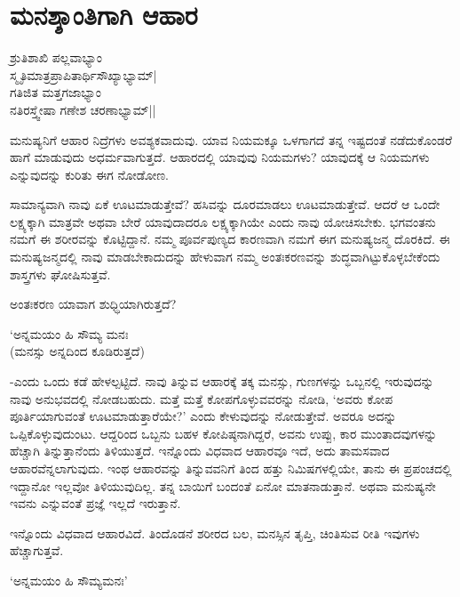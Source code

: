 \chapter{ಮನಶ್ಶಾಂತಿಗಾಗಿ ಆಹಾರ}

\begin{shloka}
ಶ್ರುತಿಶಾಖಿ ಪಲ್ಲವಾಭ್ಯಾಂ\\
ಸ್ಮೃತಿಮಾತ್ರಪ್ರಾಪಿತಾರ್ಥಿಸೌಖ್ಯಾಭ್ಯಾಮ್|\\
ಗತಿಜಿತ ಮತ್ತಗಜಾಭ್ಯಾಂ\\
ನತಿರಸ್ತ್ವೇಷಾ ಗಣೇಶ ಚರಣಾಭ್ಯಾಮ್||
\end{shloka}

ಮನುಷ್ಯನಿಗೆ ಆಹಾರ ನಿದ್ರೆಗಳು ಅವಶ್ಯಕವಾದುವು. ಯಾವ ನಿಯಮಕ್ಕೂ ಒಳಗಾಗದೆ ತನ್ನ ಇಷ್ಟದಂತೆ ನಡೆದುಕೊಂಡರೆ ಹಾಗೆ ಮಾಡುವುದು ಅಧರ್ಮವಾಗುತ್ತದೆ. ಆಹಾರದಲ್ಲಿ ಯಾವುವು ನಿಯಮಗಳು? ಯಾವುದಕ್ಕೆ ಆ ನಿಯಮಗಳು ಎನ್ನುವುದನ್ನು ಕುರಿತು ಈಗ ನೋಡೋಣ.

ಸಾಮಾನ್ಯವಾಗಿ ನಾವು ಏಕೆ ಊಟಮಾಡುತ್ತೇವೆ? ಹಸಿವನ್ನು ದೂರಮಾಡಲು ಊಟಮಾಡುತ್ತೇವೆ. ಆದರೆ ಆ ಒಂದೇ ಲಕ್ಷ್ಯಕ್ಕಾಗಿ ಮಾತ್ರವೇ ಅಥವಾ ಬೇರೆ ಯಾವುದಾದರೂ ಲಕ್ಷ್ಯಕ್ಕಾಗಿಯೇ ಎಂದು ನಾವು ಯೋಚಿಸಬೇಕು. ಭಗವಂತನು ನಮಗೆ ಈ ಶರೀರವನ್ನು ಕೊಟ್ಟಿದ್ದಾನೆ. ನಮ್ಮ ಪೂರ್ವಪುಣ್ಯದ ಕಾರಣವಾಗಿ ನಮಗೆ ಈಗ ಮನುಷ್ಯಜನ್ಮ ದೊರಕಿದೆ. ಈ ಮನುಷ್ಯಜನ್ಮದಲ್ಲಿ ನಾವು ಮಾಡಬೇಕಾದುದನ್ನು ಹೇಳುವಾಗ ನಮ್ಮ ಅಂತಃಕರಣವನ್ನು ಶುದ್ಧವಾಗಿಟ್ಟುಕೊಳ್ಳಬೇಕೆಂದು ಶಾಸ್ತ್ರಗಳು ಘೋಷಿಸುತ್ತವೆ.

ಅಂತಃಕರಣ ಯಾವಾಗ ಶುಧ್ಧಿಯಾಗಿರುತ್ತದೆ?

\begin{shloka}
`ಅನ್ನಮಯಂ ಹಿ ಸೌಮ್ಯ ಮನಃ\\
(ಮನಸ್ಸು ಅನ್ನದಿಂದ ಕೂಡಿರುತ್ತದೆ)
\end{shloka}

-ಎಂದು ಒಂದು ಕಡೆ ಹೇಳಲ್ಪಟ್ಟಿದೆ. ನಾವು ತಿನ್ನುವ ಆಹಾರಕ್ಕೆ ತಕ್ಕ ಮನಸ್ಸು, ಗುಣಗಳನ್ನು ಒಬ್ಬನಲ್ಲಿ ಇರುವುದನ್ನು ನಾವು ಅನುಭವದಲ್ಲಿ ನೋಡಬಹುದು. ಮತ್ತೆ ಮತ್ತೆ ಕೋಪಗೊಳ್ಳುವವರನ್ನು ನೋಡಿ, `ಅವರು ಕೋಪ ಪೂರ್ತಿಯಾಗುವಂತೆ ಊಟಮಾಡುತ್ತಾರೆಯೇ?' ಎಂದು ಕೇಳುವುದನ್ನು ನೋಡುತ್ತೇವೆ. ಅವರೂ ಅದನ್ನು ಒಪ್ಪಿಕೊಳ್ಳುವುದುಂಟು. ಆದ್ದರಿಂದ ಒಬ್ಬನು ಬಹಳ ಕೋಪಿಷ್ಠನಾಗಿದ್ದರೆ, ಅವನು ಉಪ್ಪು, ಕಾರ ಮುಂತಾದವುಗಳನ್ನು ಹೆಚ್ಚಾಗಿ ತಿನ್ನುತ್ತಾನೆಂದು ತಿಳಿಯುತ್ತದೆ. ಇನ್ನೊಂದು ವಿಧವಾದ ಆಹಾರವೂ ಇದೆ, ಅದು ತಾಮಸವಾದ ಆಹಾರವೆನ್ನಲಾಗುವುದು. ಇಂಥ ಆಹಾರವನ್ನು ತಿನ್ನುವವನಿಗೆ ತಿಂದ ಹತ್ತು ನಿಮಿಷಗಳಲ್ಲಿಯೇ, ತಾನು ಈ ಪ್ರಪಂಚದಲ್ಲಿ ಇದ್ದಾನೋ ಇಲ್ಲವೋ ತಿಳಿಯುವುದಿಲ್ಲ. ತನ್ನ ಬಾಯಿಗೆ ಬಂದಂತೆ ಏನೋ ಮಾತನಾಡುತ್ತಾನೆ. ಅಥವಾ ಮನುಷ್ಯನೇ ಇವನು ಎನ್ನುವಂತೆ ಪ್ರಜ್ಞೆ ಇಲ್ಲದೆ ಇರುತ್ತಾನೆ.

ಇನ್ನೊಂದು ವಿಧವಾದ ಆಹಾರವಿದೆ. ತಿಂದೊಡನೆ ಶರೀರದ ಬಲ, ಮನಸ್ಸಿನ ತೃಪ್ತಿ, ಚಿಂತಿಸುವ ರೀತಿ ಇವುಗಳು ಹೆಚ್ಚಾಗುತ್ತವೆ.

\begin{shloka}
`ಅನ್ನಮಯಂ ಹಿ ಸೌಮ್ಯಮನಃ'
\end{shloka}

